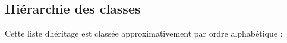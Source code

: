 \subsection{Hiérarchie des classes}
Cette liste d\textquotesingle{}héritage est classée approximativement par ordre alphabétique \+:\begin{DoxyCompactList}
\item {}
\item {}
\begin{DoxyCompactList}
\item {}
\item {}
\item {}
\end{DoxyCompactList}
\item {}
\begin{DoxyCompactList}
\item {}
\end{DoxyCompactList}
\end{DoxyCompactList}
